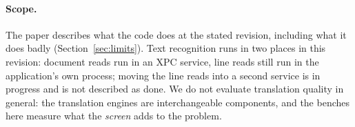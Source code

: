 \paragraph{Scope.}
The paper describes what the code does at the stated revision, including what it does badly (Section~\ref{sec:limits}). Text
recognition runs in two places in this revision: document reads run in an XPC service, line reads still run in the
application's own process; moving the line reads into a second service is in progress and is not described as done.
We do not evaluate translation quality in general: the translation engines are interchangeable components, and the benches
here measure what the \emph{screen} adds to the problem.
